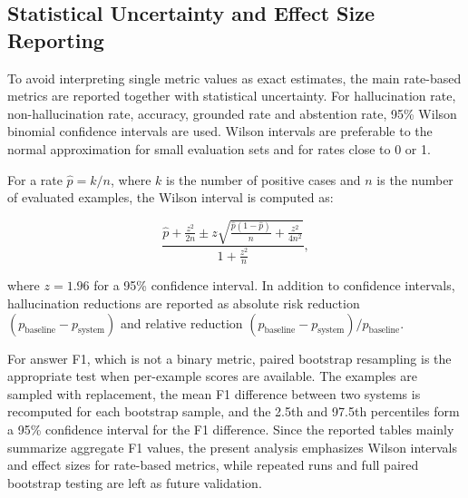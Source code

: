 
\subsection{Statistical Uncertainty and Effect Size Reporting}

To avoid interpreting single metric values as exact estimates, the main rate-based
metrics are reported together with statistical uncertainty. For hallucination rate,
non-hallucination rate, accuracy, grounded rate and abstention rate, 95\% Wilson
binomial confidence intervals are used. Wilson intervals are preferable to the
normal approximation for small evaluation sets and for rates close to 0 or 1.

For a rate \( \hat{p}=k/n \), where \(k\) is the number of positive cases and \(n\)
is the number of evaluated examples, the Wilson interval is computed as:

\begin{equation}
\frac{\hat{p} + \frac{z^2}{2n} \pm z
\sqrt{\frac{\hat{p}(1-\hat{p})}{n} + \frac{z^2}{4n^2}}}
{1+\frac{z^2}{n}},
\end{equation}

where \(z=1.96\) for a 95\% confidence interval. In addition to confidence
intervals, hallucination reductions are reported as absolute risk reduction
\((p_{\text{baseline}}-p_{\text{system}})\) and relative reduction
\((p_{\text{baseline}}-p_{\text{system}})/p_{\text{baseline}}\).

For answer F1, which is not a binary metric, paired bootstrap resampling is the
appropriate test when per-example scores are available. The examples are sampled
with replacement, the mean F1 difference between two systems is recomputed for
each bootstrap sample, and the 2.5th and 97.5th percentiles form a 95\% confidence
interval for the F1 difference. Since the reported tables mainly summarize aggregate
F1 values, the present analysis emphasizes Wilson intervals and effect sizes for
rate-based metrics, while repeated runs and full paired bootstrap testing are left as
future validation.

